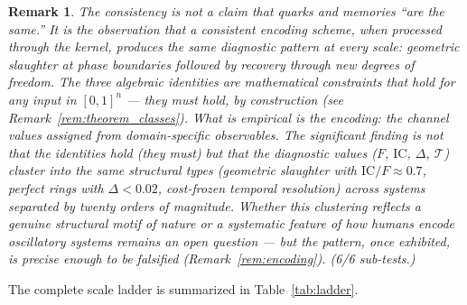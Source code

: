 \documentclass[
  aps,
  prd,
  twocolumn,
  superscriptaddress,
  nofootinbib,
  floatfix
]{revtex4-2}
\newtheorem{remark}{Remark}
\newcommand{\IC}{\mathrm{IC}}
\begin{document}
\begin{remark}
The consistency is not a claim that quarks and memories
``are the same.''  It is the observation that a consistent
encoding scheme, when processed through the kernel, produces
the same diagnostic pattern at every scale: geometric
slaughter at phase boundaries followed by recovery through
new degrees of freedom.  The three algebraic identities are
mathematical constraints that hold for \emph{any} input in
$[0,1]^n$ --- they must hold, by construction (see
Remark~\ref{rem:theorem_classes}).  What is
empirical is the encoding: the channel values assigned from
domain-specific observables.  The significant finding is not
that the identities hold (they must) but that the
\emph{diagnostic values} ($F$, $\IC$, $\Delta$, $\mathcal{T}$)
cluster into the same structural types (geometric slaughter
with $\IC/F \approx 0.7$, perfect rings with $\Delta < 0.02$,
cost-frozen temporal resolution) across systems separated by
twenty orders of magnitude.  Whether this clustering reflects
a genuine structural motif of nature or a systematic feature
of how humans encode oscillatory systems remains an open
question --- but the pattern, once exhibited, is precise
enough to be falsified (Remark~\ref{rem:encoding}).
(6/6 sub-tests.)
\end{remark}

The complete scale ladder is summarized in
Table~\ref{tab:ladder}.
\end{document}
